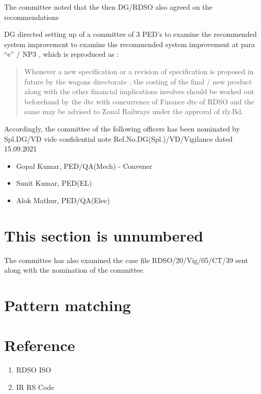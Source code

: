 \documentclass[
  11pt,
  twoside]{article}
\providecommand{\tightlist}{%
  \setlength{\itemsep}{0pt}\setlength{\parskip}{0pt}}
\begin{document}
The committee noted that the then DG/RDSO also agreed on the recommendations

DG directed setting up of a committee of 3 PED's to examine the recommended system improvement to examine the recommended system improvement at para ``e'' / NP3 , which is reproduced as :

\begin{quote}
Whenever a new specification or a revision of specification is proposed in future by the wagons directorate , the costing of the final / new product along with the other financial implications involves should be worked out beforehand by the dte with concurrence of Finance dte of RDSO and the same may be advised to Zonal Railways under the approval of rly.Bd.
\end{quote}

Accordingly, the committee of the following officers has been nominated by Spl.DG/VD vide confidential note Ref.No.DG(Spl.)/VD/Vigilance dated 15.09.2021

\begin{itemize}
\tightlist
\item
  Gopal Kumar, PED/QA(Mech) - Convener
\item
  Sunit Kumar, PED(EL)
\item
  Alok Mathur, PED/QA(Elec)
\end{itemize}

\hypertarget{this-section-is-unnumbered}{%
\section*{This section is unnumbered}\label{this-section-is-unnumbered}}

The committee has also examined the case file RDSO/20/Vig/05/CT/39 sent along with the nomination of the committee.

\hypertarget{pattern-matching}{%
\section{Pattern matching}\label{pattern-matching}}

\hypertarget{reference}{%
\section{Reference}\label{reference}}

\begin{enumerate}
\def\labelenumi{\arabic{enumi}.}
\tightlist
\item
  RDSO ISO
\item
  IR RS Code
\end{enumerate}
\end{document}
